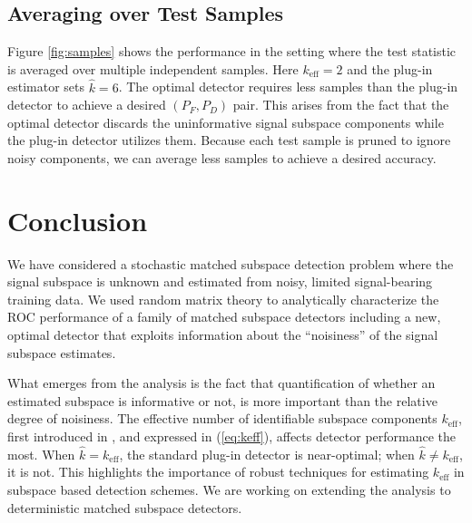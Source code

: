 \subsection{Averaging over Test Samples}
Figure \ref{fig:samples} shows the performance in the setting where the test statistic is averaged over multiple independent samples. Here $k_\text{eff} = 2$ and the plug-in estimator sets $\widehat{k} = 6$. The optimal detector requires less samples than the plug-in detector to achieve a desired $(P_F, P_D)$ pair. This arises from the fact that the optimal detector discards the uninformative signal subspace components while the plug-in detector utilizes them. Because each test sample is pruned to ignore noisy components, we can average less samples to achieve a desired accuracy.

\section{Conclusion}\label{sec:concl}
We have considered a stochastic  matched subspace detection problem where the signal subspace is unknown and estimated from noisy, limited signal-bearing training data. We used random matrix theory to analytically characterize the ROC performance of a family of matched subspace detectors including a new, optimal detector that exploits information about the ``noisiness'' of the signal subspace estimates.

What emerges from the analysis is the fact that quantification of whether an estimated subspace is informative or not, is more important than the relative degree of noisiness. The effective number of identifiable subspace components $k_\text{eff}$, first introduced in \cite{nadakuditi2008sample}, and expressed in (\ref{eq:keff}), affects detector performance the most. When $\widehat{k} = k_\text{eff}$, the standard plug-in detector is near-optimal; when $\widehat{k} \neq k_\text{eff}$, it is not. This highlights the importance of robust techniques \cite{johnstone2001distribution,el2007tracy,nadakuditi2010fundamental} for estimating $k_\text{eff}$ in subspace based detection schemes. We are working on extending the analysis to deterministic matched subspace detectors.


